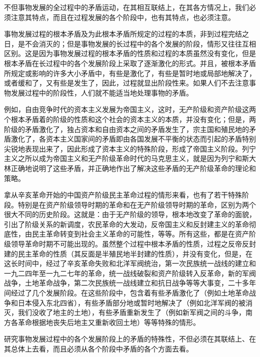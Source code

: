 不但事物发展的全过程中的矛盾运动，在其相互联结上，在其各方情况上，我们必须注意其特点，而且在过程发展的各个阶段中，也有其特点，也必须注意。

事物发展过程的根本矛盾及为此根本矛盾所规定的过程的本质，非到过程完结之日，是不会消灭的；但是事物发展的长过程中的各个发展的阶段，情形又往往互相区别。这是因为事物发展过程的根本矛盾的性质和过程的本质虽然没有变化，但是根本矛盾在长过程中的各个发展阶段上采取了逐渐激化的形式。并且，被根本矛盾所规定或影响的许多大小矛盾中，有些是激化了，有些是暂时地或局部地解决了，或者缓和了，又有些是发生了，因此，过程就显出阶段性来。如果人们不去注意事物发展过程中的阶段性，人们就不能适当地处理事物的矛盾。

例如，自由竞争时代的资本主义发展为帝国主义，这时，无产阶级和资产阶级这两个根本矛盾着的阶级的性质和这个社会的资本主义的本质，并没有变化；但是，两阶级的矛盾激化了，独占资本和自由资本之间的矛盾发生了，宗主国和殖民地的矛盾激化了，各资本主义国家间的矛盾即由各国发展不平衡的状态而引起的矛盾特别尖锐地表现出来了，因此形成了资本主义的特殊阶段，形成了帝国主义阶段。列宁主义之所以成为帝国主义和无产阶级革命时代的马克思主义，就是因为列宁和斯大林正确地说明了这些矛盾，并正确地作出了解决这些矛盾的无产阶级革命的理论和策略。

拿从辛亥革命开始的中国资产阶级民主革命过程的情形来看，也有了若干特殊阶段。特别是在资产阶级领导时期的革命和在无产阶级领导时期的革命，区别为两个很大不同的历史阶段。这就是：由于无产阶级的领导，根本地改变了革命的面貌，引出了阶级关系的新调度，农民革命的大发动，反帝国主义和反封建主义的革命彻底性，由民主革命转变到社会主义革命的可能性，等等。所有这些，都是在资产阶级领导革命时期不可能出现的。虽然整个过程中根本矛盾的性质，过程之反帝反封建的民主革命的性质（其反面是半殖民地半封建的性质），并没有变化，但是，在这长时间中，经过了辛亥革命失败和北洋军阀统治，第一次民族统一战线的建立和一九二四年至一九二七年的革命，统一战线破裂和资产阶级转入反革命，新的军阀战争，土地革命战争，第二次民族统一战线建立和抗日战争等等大事变，二十多年间经过了几个发展阶段。在这些阶段中，包含着有些矛盾激化了（例如土地革命战争和日本侵入东北四省），有些矛盾部分地或暂时地解决了（例如北洋军阀的被消灭，我们没收了地主的土地），有些矛盾重新发生了（例如新军阀之间的斗争，南方各革命根据地丧失后地主又重新收回土地）等等特殊的情形。

研究事物发展过程中的各个发展阶段上的矛盾的特殊性，不但必须在其联结上、在其总体上去看，而且必须从各个阶段中矛盾的各个方面去看。

